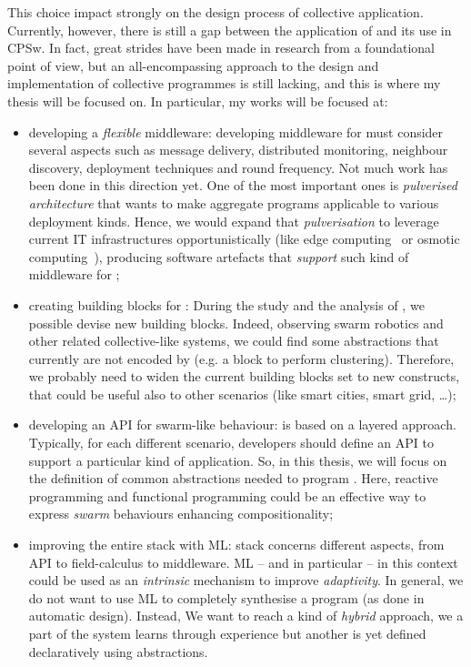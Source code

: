 \documentclass[11pt]{article}
\begin{document}
This choice impact strongly on the design process of collective application.
%
Currently, however, there is still a gap between the application of \ac{} and its use in CPSw. 
%
In fact, great strides have been made in research from a foundational point of view, but an all-encompassing approach to the design and implementation of collective programmes is still lacking, and this is where my thesis will be focused on.
%
In particular, my works will be focused at:
\begin{itemize}
	\item developing a \textit{flexible} middleware: 
	developing middleware for \ac{} must consider several aspects such as message delivery, distributed monitoring, neighbour discovery, deployment techniques and round frequency. Not much work has been done in this direction yet. One of the most important ones is \emph{pulverised architecture}\cite{DBLP:journals/fi/CasadeiPPVW20} that wants to make aggregate programs applicable to various deployment kinds. Hence, we would expand that \emph{pulverisation} to leverage current IT infrastructures opportunistically (like edge computing~\cite{DBLP:journals/computer/Satyanarayanan17} or osmotic computing~\cite{DBLP:journals/cloudcomp/VillariFDRR16}), producing software artefacts that \textit{support} such kind of middleware for \cpsw{};
	\item creating building blocks for \cpsw{}: During the study and the analysis of \cpsw{}, we possible devise new building blocks.  Indeed, observing swarm robotics and other related collective-like systems, we could find some abstractions that currently are not encoded by \ac{} (e.g. a block to perform clustering). Therefore, we probably need to widen the current building blocks set to new constructs, that could be useful also to other scenarios (like smart cities, smart grid, \dots{});
	\item developing an API for swarm-like behaviour: \ac{} is based on a layered approach. Typically, for each different scenario, developers should define an API to support a particular kind of application. So, in this thesis, we will focus on the definition of common abstractions needed to program \cpsw{}. Here, reactive programming and functional programming could be an effective way to express \textit{swarm} behaviours enhancing compositionality;
	\item improving the entire \ac{} stack with ML: \ac{} stack concerns different aspects, from API to field-calculus to middleware. ML -- and in particular \rl{} -- in this context could be used as an \emph{intrinsic} mechanism to improve \emph{adaptivity}. In general, we do not want to use ML to completely synthesise a program (as done in automatic design). Instead, We want to reach a kind of \textit{hybrid} approach, we a part of the system learns through experience but another is yet defined declaratively using \ac{} abstractions.
\end{itemize}
\end{document}

